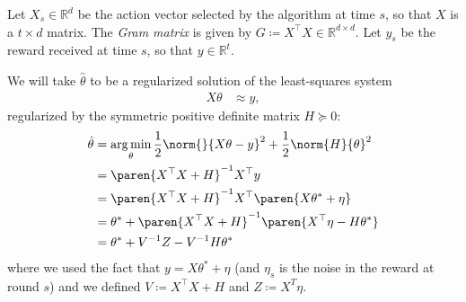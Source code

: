 \documentclass{article}
\newcommand{\defeq}{\coloneq}
\newcommand{\inv}[1]{#1^{-1}}
\newcommand{\Real}{\mathds{R}}
\DeclareMathOperator*{\argmin}{arg\,min}
\DeclarePairedDelimiter{\paren}()
\providecommand\transp{\top}
\let\transpsymbol\transp
\renewcommand{\transp}[1]{#1^\transpsymbol}
\begin{document}
Let $X_s \in \Real^d$ be the action vector selected by the algorithm at
time $s$, so that $X$ is a $t \times d$ matrix.  The \emph{Gram matrix} is given by
$G \defeq \transp{X}X \in \Real^{d \times d}$.  Let $y_s$ be the
reward received at time $s$, so that $y\in\Real^t$.

We will take $\hat{\theta}$ to be a regularized solution of the
least-squares system
\begin{align*}
  X\theta &\approx y,
\end{align*}
regularized by the symmetric positive definite matrix $H \succeq 0$:
\begin{align*}
  \hat{\theta} &= \argmin_\theta \frac{1}{2}\norm{}{X\theta - y}^2 + \frac{1}{2}\norm{H}{\theta}^2 \\
               &= \inv{\paren{\transp{X}X + H}} \transp{X}y \\
               &= \inv{\paren{\transp{X}X + H}} \transp{X} \paren{X\theta^* + \eta} \\
               &= \theta^* + \inv{\paren{\transp{X}X + H}}\paren{\transp{X}\eta - H\theta^*} \\
               &= \theta^* + \inv{V}Z - \inv{V}H\theta^*
\end{align*}
where we used the fact that $y = X\theta^* + \eta$ (and $\eta_s$ is the
noise in the reward at round $s$) and we defined $V \defeq \transp{X}X
+ H$ and $Z\defeq X^T\eta$.
\end{document}
